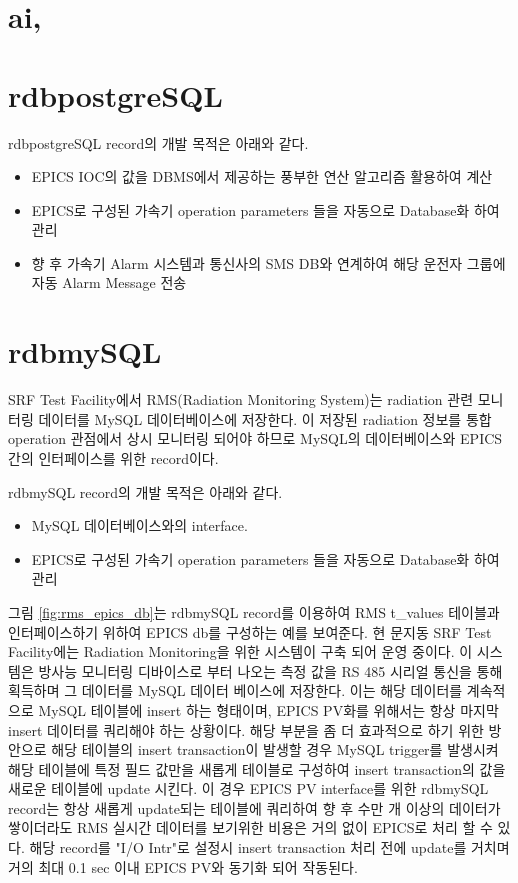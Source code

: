 \documentclass[11pt
  , a4paper
  , article
  , oneside
]{memoir}
\begin{document}
\clearpage


\chapter{ai, }

\chapter{rdbpostgreSQL}

rdbpostgreSQL record의 개발 목적은 아래와 같다.
\begin{itemize}
	\item EPICS IOC의 값을 DBMS에서 제공하는 풍부한 연산 알고리즘 활용하여 계산
	\item EPICS로 구성된 가속기 operation parameters 들을 자동으로 Database화 하여 관리
	\item 향 후 가속기 Alarm 시스템과 통신사의 SMS DB와 연계하여 해당 운전자 그룹에 자동 Alarm Message 전송
\end{itemize}

\chapter{rdbmySQL}
SRF Test Facility에서 RMS(Radiation Monitoring System)는 radiation 관련 모니터링 데이터를 MySQL 데이터베이스에 저장한다. 이 저장된 radiation 정보를 통합 operation 관점에서 상시 모니터링 되어야 하므로 MySQL의 데이터베이스와 EPICS간의 인터페이스를 위한 record이다.

rdbmySQL record의 개발 목적은 아래와 같다.
\begin{itemize}
	\item MySQL 데이터베이스와의 interface.
	\item EPICS로 구성된 가속기 operation parameters 들을 자동으로 Database화 하여 관리
\end{itemize}

그림 \ref{fig:rms_epics_db}는 rdbmySQL record를 이용하여 RMS t\_values 테이블과 인터페이스하기 위하여 EPICS db를 구성하는 예를 보여준다. 현 문지동 SRF Test Facility에는 Radiation Monitoring을 위한 시스템이 구축 되어 운영 중이다. 이 시스템은 방사능 모니터링 디바이스로 부터 나오는 측정 값을 RS 485 시리얼 통신을 통해 획득하며 그 데이터를 MySQL 데이터 베이스에 저장한다. 이는 해당 데이터를 계속적으로 MySQL 테이블에 insert 하는 형태이며, EPICS PV화를 위해서는 항상 마지막 insert 데이터를 쿼리해야 하는 상황이다. 해당 부분을 좀 더 효과적으로 하기 위한 방안으로 해당 테이블의 insert transaction이 발생할 경우 MySQL trigger를 발생시켜 해당 테이블에 특정 필드 값만을 새롭게 테이블로 구성하여 insert transaction의 값을 새로운 테이블에 update 시킨다. 이 경우 EPICS PV interface를 위한 rdbmySQL record는 항상 새롭게 update되는 테이블에 쿼리하여 향 후 수만 개 이상의 데이터가 쌓이더라도 RMS 실시간 데이터를 보기위한 비용은 거의 없이 EPICS로 처리 할 수 있다. 해당 record를 "I/O Intr"로 설정시 insert transaction 처리 전에 update를 거치며 거의 최대 0.1 sec 이내 EPICS PV와 동기화 되어 작동된다.
\end{document}
